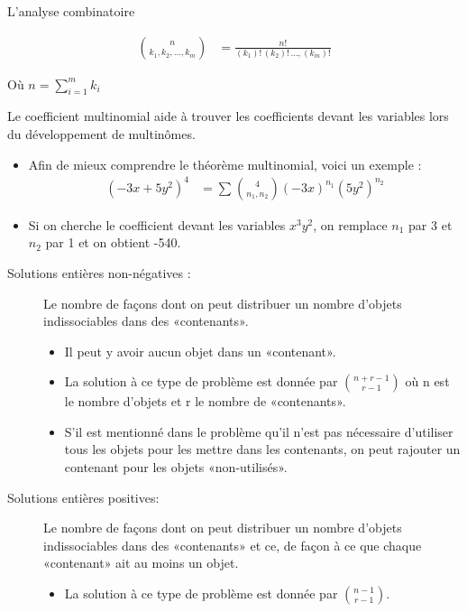 \documentclass[10pt, french]{article}
\begin{document}
\begin{multicols*}{3}
\begin{probch1}{L'analyse combinatoire}
\begin{description}
\begin{align*}
  \binom{n}{k_1, k_2, ..., k_m}
  &= \frac{n!}{(k_1)! \, (k_2)! \, ..., (k_m)!}
  \end{align*}
  \item[] Où {$n = \sum_{i = 1}^{m} k_i$}
  \item[Théorème multinomial :] Le coefficient multinomial aide à trouver les coefficients devant les variables lors du développement de multinômes. 
  \begin{itemize}
	  \item Afin de mieux comprendre le théorème multinomial, voici un exemple :
	  	\setlength{\mathindent}{-1cm}
		  \begin{align*}
			(-3x+5y^2)^4 
			&=	\sum_{}^{} \binom{4}{n_1 , n_2} (-3x)^{n_1} (5y^{2})^{n_2}
		  \end{align*}
		\setlength{\mathindent}{1cm}
	 \item Si on cherche le coefficient devant les variables $x^{3}y^{2}$, on remplace $n_1$ par 3 et $n_2$ par 1 et on obtient -540.
\end{itemize} 
\end{description}  
\begin{description}
  \item[Solutions entières non-négatives :] Le nombre de façons dont on peut distribuer un nombre d'objets indissociables dans des «contenants». 
	\begin{itemize}
		\item Il peut y avoir aucun objet dans un «contenant». 
		\item La solution à ce type de problème est donnée par $\binom{n+r-1}{r-1}$ où n est le nombre d'objets et r le nombre de «contenants». 
		\item S'il est mentionné dans le problème qu'il n'est pas nécessaire d'utiliser tous les objets pour les mettre dans les contenants, on peut rajouter un contenant pour les objets «non-utilisés».
	\end{itemize}
  \item[Solutions entières positives:] Le nombre de façons dont on peut distribuer un nombre d'objets indissociables dans des «contenants» et ce, de façon à ce que chaque «contenant» ait au moins un objet. 
  \begin{itemize}
	  \item La solution à ce type de problème est donnée par $\binom{n-1}{r-1}$.
  \end{itemize} 
\end{description}
\end{probch1}


\end{multicols*}
\end{document}
